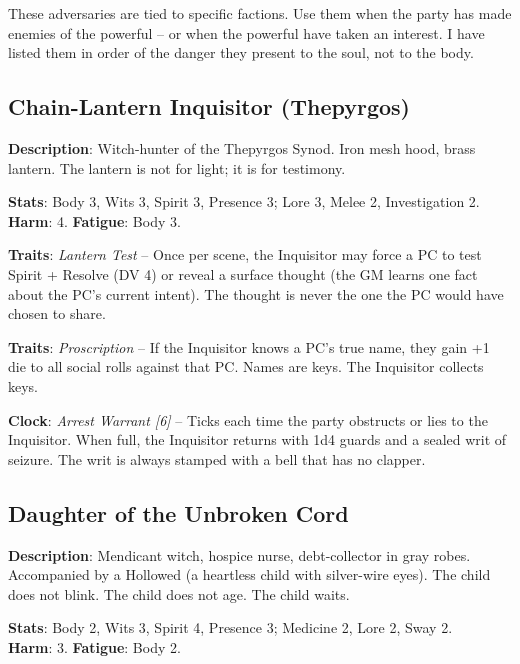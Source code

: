 These adversaries are tied to specific factions. Use them when the party has made enemies of the powerful -- or when the powerful have taken an interest. I have listed them in order of the danger they present to the soul, not to the body.

\subsection*{Chain-Lantern Inquisitor (Thepyrgos)}

\noindent\textbf{Description}: Witch-hunter of the Thepyrgos Synod. Iron mesh hood, brass lantern. The lantern is not for light; it is for testimony.

\noindent\textbf{Stats}: Body 3, Wits 3, Spirit 3, Presence 3; Lore 3, Melee 2, Investigation 2.\\
\textbf{Harm}: 4. \textbf{Fatigue}: Body 3.

\noindent\textbf{Traits}: \emph{Lantern Test} -- Once per scene, the Inquisitor may force a PC to test Spirit + Resolve (DV 4) or reveal a surface thought (the GM learns one fact about the PC's current intent). The thought is never the one the PC would have chosen to share.

\noindent\textbf{Traits}: \emph{Proscription} -- If the Inquisitor knows a PC's true name, they gain +1 die to all social rolls against that PC. Names are keys. The Inquisitor collects keys.

\noindent\textbf{Clock}: \emph{Arrest Warrant [6]} -- Ticks each time the party obstructs or lies to the Inquisitor. When full, the Inquisitor returns with 1d4 guards and a sealed writ of seizure. The writ is always stamped with a bell that has no clapper.


\subsection*{Daughter of the Unbroken Cord}

\noindent\textbf{Description}: Mendicant witch, hospice nurse, debt-collector in gray robes. Accompanied by a Hollowed (a heartless child with silver-wire eyes). The child does not blink. The child does not age. The child waits.

\noindent\textbf{Stats}: Body 2, Wits 3, Spirit 4, Presence 3; Medicine 2, Lore 2, Sway 2.\\
\textbf{Harm}: 3. \textbf{Fatigue}: Body 2.


